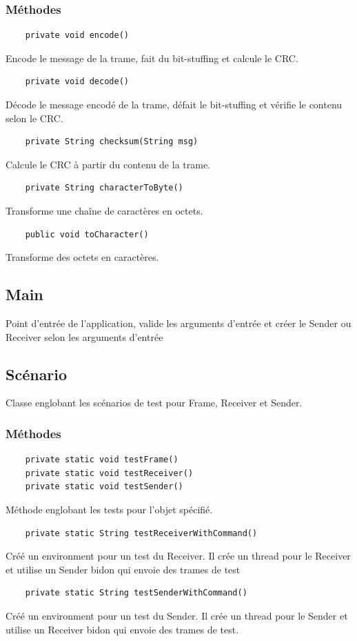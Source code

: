 \documentclass[a4paper,12pt]{article}
\begin{document}
\begin{spacing}{1}
	\subsubsection*{Méthodes}
	\begin{lstlisting}
	private void encode()
	\end{lstlisting}
	Encode le message de la trame, fait du bit-stuffing et calcule le CRC.
	\begin{lstlisting}
	private void decode()
	\end{lstlisting}
	Décode le message encodé de la trame, défait le bit-stuffing et vérifie le contenu selon le CRC.
	\begin{lstlisting}
	private String checksum(String msg)
	\end{lstlisting}
	Calcule le CRC à partir du contenu de la trame.
	\begin{lstlisting}
	private String characterToByte()
	\end{lstlisting}
	Transforme une chaîne de caractères en octets.
	\begin{lstlisting}
	public void toCharacter()
	\end{lstlisting}
	Transforme des octets en caractères.
	\end{spacing}
	\subsection*{Main}
	Point d'entrée de l'application, valide les arguments d'entrée et créer le Sender ou Receiver selon les arguments d'entrée
	\newpage
	\subsection*{Scénario}
	Classe englobant les scénarios de test pour Frame, Receiver et Sender.
	\subsubsection*{Méthodes}
	\begin{lstlisting}
	private static void testFrame()
	private static void testReceiver()
	private static void testSender()
	\end{lstlisting}
	Méthode englobant les tests pour l'objet spécifié.
	\begin{lstlisting}
	private static String testReceiverWithCommand()
	\end{lstlisting}
	Créé un environment pour un test du Receiver. Il crée un thread pour le Receiver et utilise un Sender bidon qui envoie des trames de test
	\begin{lstlisting}
	private static String testSenderWithCommand()
	\end{lstlisting}
	Créé un environment pour un test du Sender. Il crée un thread pour le Sender et utilise un Receiver bidon qui envoie des trames de test.
\end{document}
